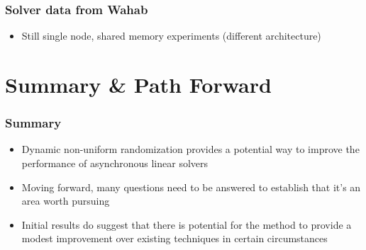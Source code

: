 \documentclass{beamer}
\begin{document}
\begin{frame}
	\frametitle{Solver data from Wahab}
	\begin{figure}
	    \centering
	\end{figure}
	\begin{itemize}
	    \item Still single node, shared memory experiments (different architecture)
	\end{itemize}
\end{frame}

\section{Summary \& Path Forward}

\begin{frame}
	\frametitle{Summary}
	\begin{itemize}
		\item Dynamic non-uniform randomization provides a potential way to improve the performance of asynchronous linear solvers
		\item Moving forward, many questions need to be answered to establish that it's an area worth pursuing
		\item Initial results do suggest that there is potential for the method to provide a modest improvement over existing techniques in certain circumstances
	\end{itemize}
\end{frame}
\end{document}
